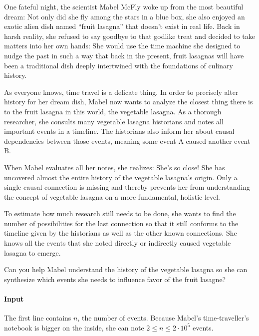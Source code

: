



\makeheader

One fateful night, the scientist Mabel McFly woke up from the most beautiful dream: Not only did she fly among the stars in a blue box, she also enjoyed an exotic alien dish named “fruit lasagna” that doesn’t exist in real life. Back in harsh reality, she refused to say goodbye to that godlike treat and decided to take matters into her own hands: She would use the time machine she designed to nudge the past in such a way that back in the present, fruit lasagnas will have been a traditional dish deeply intertwined with the foundations of culinary history.

As everyone knows, time travel is a delicate thing. In order to precisely alter history for her dream dish, Mabel now wants to analyze the closest thing there is to the fruit lasagna in this world, the vegetable lasagna.
As a thorough researcher, she consults many vegetable lasagna historians and notes all important events in a timeline. The historians also inform her about causal dependencies between those events, meaning some event A caused another event B.

When Mabel evaluates all her notes, she realizes: She’s so close! She has uncovered almost the entire history of the vegetable lasagna’s origin. Only a single causal connection is missing and thereby prevents her from understanding the concept of vegetable lasagna on a more fundamental, holistic level.

To estimate how much research still needs to be done, she wants to find the number of possibilities for the last connection so that it still conforms to the timeline given by the historians as well as the other known connections. She knows all the events that she noted directly or indirectly caused vegetable lasagna to emerge.

Can you help Mabel understand the history of the vegetable lasagna so she can synthesize which events she needs to influence favor of the fruit lasagne?

\paragraph*{Input}

The first line contains $n$, the number of events.
Because Mabel's time-traveller’s notebook is bigger on the inside, she can note $2 \leq n \leq 2\cdot 10^5$ events.

